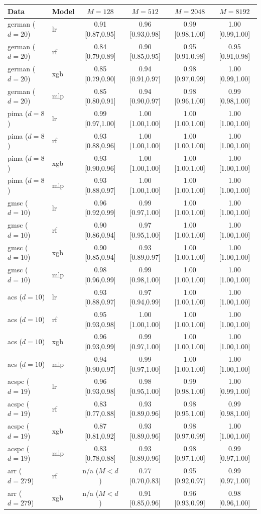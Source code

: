 \begin{tabular}{llcccc}\toprule
Data & Model & $M{=}128$ & $M{=}512$ & $M{=}2048$ & $M{=}8192$\\\midrule
german ($d{=}20$) & lr & 0.91 [0.87,0.95] & 0.96 [0.93,0.98] & 0.99 [0.98,1.00] & 1.00 [0.99,1.00]\\
german ($d{=}20$) & rf & 0.84 [0.79,0.89] & 0.90 [0.85,0.95] & 0.95 [0.91,0.98] & 0.95 [0.91,0.98]\\
german ($d{=}20$) & xgb & 0.85 [0.79,0.90] & 0.94 [0.91,0.97] & 0.98 [0.97,0.99] & 1.00 [0.99,1.00]\\
german ($d{=}20$) & mlp & 0.85 [0.80,0.91] & 0.94 [0.90,0.97] & 0.98 [0.96,1.00] & 0.99 [0.98,1.00]\\
pima ($d{=}8$) & lr & 0.99 [0.97,1.00] & 1.00 [1.00,1.00] & 1.00 [1.00,1.00] & 1.00 [1.00,1.00]\\
pima ($d{=}8$) & rf & 0.93 [0.88,0.96] & 1.00 [1.00,1.00] & 1.00 [1.00,1.00] & 1.00 [1.00,1.00]\\
pima ($d{=}8$) & xgb & 0.93 [0.90,0.96] & 1.00 [1.00,1.00] & 1.00 [1.00,1.00] & 1.00 [1.00,1.00]\\
pima ($d{=}8$) & mlp & 0.93 [0.88,0.97] & 1.00 [1.00,1.00] & 1.00 [1.00,1.00] & 1.00 [1.00,1.00]\\
gmsc ($d{=}10$) & lr & 0.96 [0.92,0.99] & 0.99 [0.97,1.00] & 1.00 [1.00,1.00] & 1.00 [1.00,1.00]\\
gmsc ($d{=}10$) & rf & 0.90 [0.86,0.94] & 0.97 [0.95,1.00] & 1.00 [1.00,1.00] & 1.00 [1.00,1.00]\\
gmsc ($d{=}10$) & xgb & 0.90 [0.85,0.94] & 0.93 [0.89,0.97] & 1.00 [1.00,1.00] & 1.00 [1.00,1.00]\\
gmsc ($d{=}10$) & mlp & 0.98 [0.96,0.99] & 0.99 [0.98,1.00] & 1.00 [1.00,1.00] & 1.00 [1.00,1.00]\\
acs ($d{=}10$) & lr & 0.93 [0.88,0.97] & 0.97 [0.94,0.99] & 1.00 [1.00,1.00] & 1.00 [1.00,1.00]\\
acs ($d{=}10$) & rf & 0.95 [0.93,0.98] & 1.00 [1.00,1.00] & 1.00 [1.00,1.00] & 1.00 [1.00,1.00]\\
acs ($d{=}10$) & xgb & 0.96 [0.93,0.99] & 0.99 [0.97,1.00] & 1.00 [1.00,1.00] & 1.00 [1.00,1.00]\\
acs ($d{=}10$) & mlp & 0.94 [0.90,0.97] & 0.99 [0.97,1.00] & 1.00 [1.00,1.00] & 1.00 [1.00,1.00]\\
acspc ($d{=}19$) & lr & 0.96 [0.93,0.98] & 0.98 [0.95,1.00] & 0.99 [0.98,1.00] & 1.00 [0.99,1.00]\\
acspc ($d{=}19$) & rf & 0.83 [0.77,0.88] & 0.93 [0.89,0.96] & 0.98 [0.95,1.00] & 0.99 [0.98,1.00]\\
acspc ($d{=}19$) & xgb & 0.87 [0.81,0.92] & 0.93 [0.89,0.96] & 0.98 [0.97,0.99] & 1.00 [1.00,1.00]\\
acspc ($d{=}19$) & mlp & 0.83 [0.78,0.88] & 0.93 [0.89,0.96] & 0.98 [0.97,1.00] & 0.99 [0.97,1.00]\\
arr ($d{=}279$) & rf & n/a ($M{<}d$) & 0.77 [0.70,0.83] & 0.95 [0.92,0.97] & 0.99 [0.97,1.00]\\
arr ($d{=}279$) & xgb & n/a ($M{<}d$) & 0.91 [0.85,0.96] & 0.96 [0.93,0.99] & 0.98 [0.96,1.00]\\
\bottomrule\end{tabular}